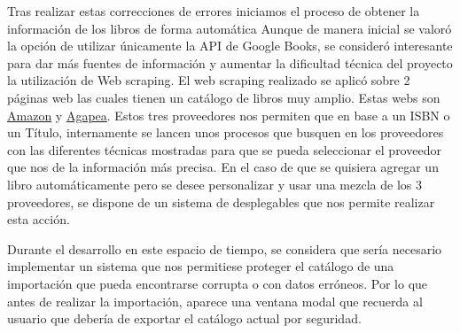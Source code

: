 Tras realizar estas correcciones de errores iniciamos el proceso de obtener la información  de los libros de forma automática Aunque de manera inicial se valoró la opción de utilizar únicamente la API de Google Books,  se consideró interesante para  dar más fuentes de información y aumentar la dificultad técnica del proyecto la utilización de Web scraping. 
El  web scraping realizado se aplicó sobre 2 páginas web las cuales tienen un catálogo de libros muy amplio. Estas webs son \href{https://www.amazon.es/}{Amazon} y \href{https://www.agapea.com/}{Agapea}. Estos tres proveedores nos permiten que en base a un ISBN o un Título, internamente se lancen unos procesos que busquen en los proveedores con las diferentes técnicas mostradas para que se pueda seleccionar el proveedor que nos de la información más precisa. 
En el caso de que se quisiera agregar un libro automáticamente pero se desee personalizar y usar una mezcla de los 3 proveedores, se dispone de un sistema de desplegables que nos permite realizar esta acción.

Durante el desarrollo en este espacio de tiempo, se considera que sería necesario implementar un sistema que nos permitiese proteger el catálogo de una importación que pueda encontrarse corrupta o con datos erróneos.
Por lo que antes de realizar la importación, aparece una ventana modal que recuerda al usuario que debería de exportar el catálogo actual por seguridad.